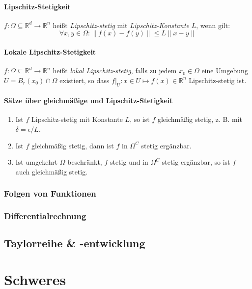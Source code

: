 \documentclass[a4paper, 9pt, DIV=24]{scrartcl}
\newcommand{\R}{\mathbb{R}}
\begin{document}
\paragraph{Lipschitz-Stetigkeit}
$f: \Omega \subseteq \R^d \rightarrow \R^n$ heißt \emph{Lipschitz-stetig} mit \emph{Lipschitz-Konstante} $L$, wenn gilt:
\[ \forall x,y\in\Omega: \|f(x)-f(y)\| \leq L\|x-y\|\]

\paragraph{Lokale Lipschitz-Stetigkeit}
$f: \Omega \subseteq \R^d \rightarrow \R^n$ heißt \emph{lokal Lipschitz-stetig},
falls zu jedem $x_0\in\Omega$ eine Umgebung $U = B_r(x_0)\cap\Omega$ existiert,
so dass $f|_U : x \in U \mapsto f(x) \in \R^n$ Lipschitz-stetig ist.


\paragraph{Sätze über gleichmäßige und Lipschitz-Stetigkeit}
\begin{enumerate}[label={(}\arabic*{)}]
 \item Ist $f$ Lipschitz-stetig mit Konstante $L$, so ist $f$ gleichmäßig stetig, z. B. mit $\delta = \epsilon/L$.
 \item Ist $f$ gleichmäßig stetig, dann ist $f$ in $\Omega^C$ stetig ergänzbar.
 \item Ist umgekehrt $\Omega$ beschränkt, $f$ stetig und in $\Omega^C$ stetig ergänzbar, so ist $f$ auch gleichmäßig stetig.
\end{enumerate}

\subsubsection{Folgen von Funktionen}
\subsubsection{Differentialrechnung}


\subsection{Taylorreihe \& -entwicklung}

\clearpage
\section{Schweres}
\end{document}
